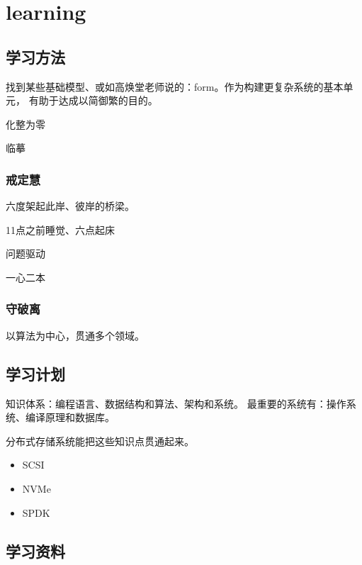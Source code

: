 \chapter{learning}

\section{学习方法}

找到某些基础模型、或如高焕堂老师说的：form。作为构建更复杂系统的基本单元，
有助于达成以简御繁的目的。

化整为零

临摹

\subsection{戒定慧}

六度架起此岸、彼岸的桥梁。

\begin{enumbox}
\item 11点之前睡觉、六点起床
\item 问题驱动
\item 一心二本
\end{enumbox}

\subsection{守破离}

以算法为中心，贯通多个领域。


\section{学习计划}

知识体系：编程语言、数据结构和算法、架构和系统。
最重要的系统有：操作系统、编译原理和数据库。

分布式存储系统能把这些知识点贯通起来。

\begin{itemize}
    \item SCSI
    \item NVMe
    \item SPDK
\end{itemize}

\section{学习资料}

